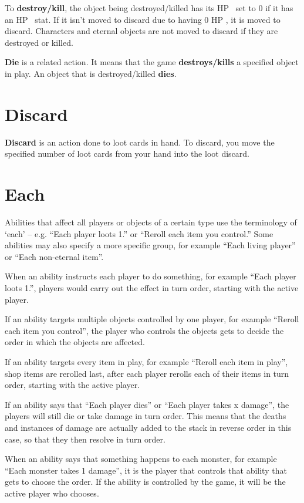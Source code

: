 \documentclass[
  fontsize=10pt,
  paper=a5,
  version=last,
  chapterprefix=true,
  bindingoffset=5mm,
  ]{scrbook}
\newcommand*{\inlineicon}[1]{%
    \raisebox{-.3\baselineskip}{%
        \smash{%
            \texttt{[image: \#1]}%
        }%
    }%
}
\newcommand{\heart}{\inlineicon{./assets/ms-heart.png}}
\begin{document}
    To \textbf{destroy/kill}, the object being destroyed/killed has its HP\heart\ set to 0 if it has an HP\heart\ stat. If it isn’t moved to discard due to having 0 HP\heart, it is moved to discard. Characters and eternal objects are not moved to discard if they are destroyed or killed.

    \textbf{Die} is a related action. It means that the game \textbf{destroys/kills} a specified object in play. An object that is destroyed/killed \textbf{dies}.
    \section{Discard}
    \textbf{Discard} is an action done to loot cards in hand. To discard, you move the specified number of loot cards from your hand into the loot discard.
    \section{Each}
    Abilities that affect all players or objects of a certain type use the terminology of ‘each’ – e.g. “Each player loots 1.” or “Reroll each item you control.” Some abilities may also specify a more specific group, for example “Each living player” or “Each non-eternal item”.

    When an ability instructs each player to do something, for example “Each player loots 1.”, players would carry out the effect in turn order, starting with the active player.

    If an ability targets multiple objects controlled by one player, for example “Reroll each item you control”, the player who controls the objects gets to decide the order in which the objects are affected.

    If an ability targets every item in play, for example “Reroll each item in play”, shop items are rerolled last, after each player rerolls each of their items in turn order, starting with the active player.

    If an ability says that “Each player dies” or “Each player takes x damage”, the players will still die or take damage in turn order. This means that the deaths and instances of damage are actually added to the stack in reverse order in this case, so that they then resolve in turn order.

    When an ability says that something happens to each monster, for example “Each monster takes 1 damage”, it is the player that controls that ability that gets to choose the order. If the ability is controlled by the game, it will be the active player who chooses.
\end{document}
